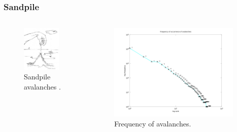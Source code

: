 \documentclass[notes]{beamer}
\begin{document}
\frame
{
  \frametitle{Sandpile}

  \begin{columns}[c]
     \begin{figure}[h!]
     \centering
     \includegraphics[width=0.9\textwidth]{images/sandpile.jpg}
     \caption{Sandpile avalanches \citep{bak1999}.}
     \label{fig:sandpile}
     \end{figure}  
     \begin{figure}[h!]
     \centering
     \includegraphics[width=0.95\textwidth]{images/sandpileavalancheszipf.png}
     \caption{Frequency of avalanches.}
     \label{fig:sandpileavalancheszipf}
     \end{figure} 
  \end{columns}
}
\end{document}
